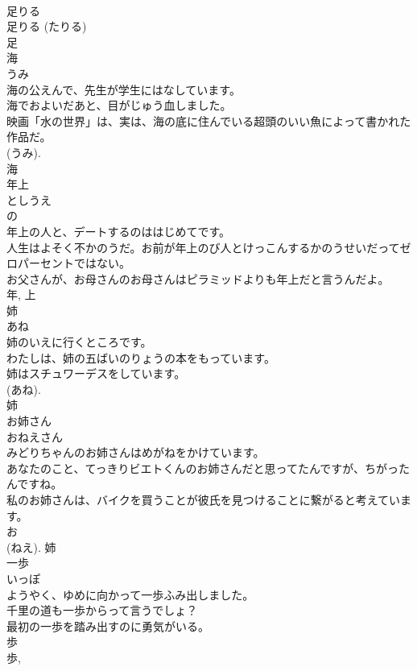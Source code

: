 \documentclass[8pt]{extreport}
\begin{document}
\begin{CJK}{UTF8}{min}
\\	足りる 
\\	足りる (たりる) 
\\	足	
\\	海	
\\	うみ	
\\	海の公えんで、先生が学生にはなしています。	
\\	海でおよいだあと、目がじゅう血しました。	
\\	映画「水の世界」は、実は、海の底に住んでいる超頭のいい魚によって書かれた作品だ。	
\\	(うみ). 
\\	海	
\\	年上	
\\	としうえ	
\\	の 
\\	年上の人と、デートするのははじめてです。	
\\	人生はよそく不かのうだ。お前が年上のび人とけっこんするかのうせいだってゼロパーセントではない。	
\\	お父さんが、お母さんのお母さんはピラミッドよりも年上だと言うんだよ。	
\\	年, 上	
\\	姉	
\\	あね	
\\	姉のいえに行くところです。	
\\	わたしは、姉の五ばいのりょうの本をもっています。	
\\	姉はスチュワーデスをしています。	
\\	(あね). 
\\	姉	
\\	お姉さん	
\\	おねえさん	
\\	みどりちゃんのお姉さんはめがねをかけています。	
\\	あなたのこと、てっきりビエトくんのお姉さんだと思ってたんですが、ちがったんですね。	
\\	私のお姉さんは、バイクを買うことが彼氏を見つけることに繋がると考えています。	
\\	お 
\\	(ねえ).	姉	
\\	一歩	
\\	いっぽ	
\\	ようやく、ゆめに向かって一歩ふみ出しました。	
\\	千里の道も一歩からって言うでしょ？	
\\	最初の一歩を踏み出すのに勇気がいる。	
\\	歩 
\\	歩, 

\end{CJK}
\end{document}
